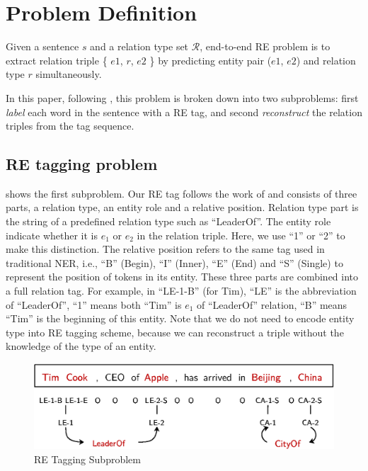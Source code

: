 \section{Problem Definition}

\begin{defn}
  Given a sentence $s$ and a relation type set $\mathcal{R}$, end-to-end
  RE problem is to extract relation triple \{ $e1$, $r$, $e2$ \} by
  predicting entity pair ($e1$, $e2$) and relation type $r$ simultaneously.
\end{defn}

In this paper, following \citet{Zheng2017}, this problem is broken down into two
subproblems: first {\em label} each word in the sentence with a RE tag, and
second {\em reconstruct} the relation triples from the tag sequence.

\subsection{RE tagging problem}
 shows the first subproblem.
Our RE tag follows the work of \cite{Zheng2017} and consists of three parts, a relation
type, an entity role and
a relative position. Relation type part is the string of a predefined
relation type such as ``LeaderOf''. The entity role indicate whether it is
$e_1$ or $e_2$ in the relation triple. Here, we use ``1'' or ``2'' 
to make this distinction.  The relative position refers to the same tag used in
traditional NER, i.e., ``B'' (Begin), ``I'' (Inner), ``E'' (End) and ``S''
(Single) to represent the position of tokens in its entity. These three parts
are combined into a full relation tag. For example, in ``LE-1-B'' (for Tim),
``LE'' is the abbreviation of ``LeaderOf'', ``1'' means both ``Tim'' is  $e_1$
of ``LeaderOf'' relation, ``B'' means ``Tim'' is
the beginning of this entity. 
Note that we do not need to encode entity type into RE tagging scheme, 
because we can reconstruct a triple without the knowledge of the type of an
entity.



\begin{figure}[th]
\centering
\includegraphics[width=\columnwidth]{pictures/endre.eps}
\caption{RE Tagging Subproblem \label{fig:re-tag}}
\end{figure}


